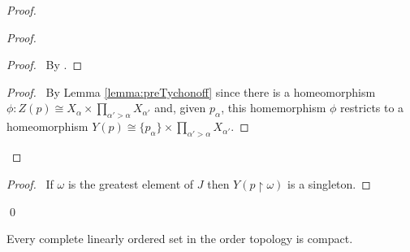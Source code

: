 \begin{proof}
    \begin{proof}
        \begin{proof}
            \pf\ By .
        \end{proof}
        \begin{proof}
            \pf\ By Lemma \ref{lemma:preTychonoff} since there is a homeomorphism $\phi : Z(p) \cong X_\alpha \times \prod_{\alpha' > \alpha} X_{\alpha'}$
            and, given $p_\alpha$, this homemorphism $\phi$ restricts to a homeomorphism $Y(p) \cong \{ p_\alpha \}  \times \prod_{\alpha' > \alpha} X_{\alpha'}$.
        \end{proof}
    \end{proof}
    \qedstep
    \begin{proof}
        \pf\ If $\omega$ is the greatest element of $J$ then $Y(p \restriction \omega)$ is a singleton.
    \end{proof}
    \qed
\end{proof}

\begin{theorem}
    Every complete linearly ordered set in the order topology is compact.
\end{theorem}

